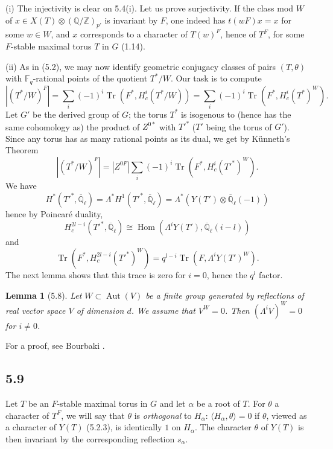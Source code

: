 \documentclass[11pt]{amsart}
\theoremstyle{plain}
\newtheorem{lemma}[theorem]{Lemma}
\theoremstyle{remark}
\DeclareMathOperator{\Hom}{Hom}
\DeclareMathOperator{\Tr}{Tr}
\DeclareMathOperator{\Aut}{Aut}
\begin{document}
(i) The injectivity is clear on 5.4(i). Let us prove surjectivity. If the class mod $W$ of $x \in X(T) \otimes (\mathbb{Q}/\mathbb{Z})_{p'}$ is invariant by $F$, one indeed has $t(wF)x = x$ for some $w \in W$, and $x$ corresponds to a character of $T(w)^F$, hence of $T^F$, for some $F$-stable maximal torus $T$ in $G$ (1.14).

(ii) As in (5.2), we may now identify geometric conjugacy classes of pairs $(T, \theta)$ with $\mathbb{F}_q$-rational points of the quotient $T^*/W$. Our task is to compute
\[
|(T^*/W)^F| = \sum_i (-1)^i \Tr(F^*, H_c^i(T^*/W)) = \sum_i (-1)^i \Tr(F^*, H_c^i(T^*)^W).
\]
Let $G'$ be the derived group of $G$; the torus $T^*$ is isogenous to (hence has the same cohomology as) the product of $Z^{0*}$ with $T'^*$ ($T'$ being the torus of $G'$). Since any torus has as many rational points as its dual, we get by K\"unneth's Theorem
\[
|(T^*/W)^F| = |Z^{0F}| \sum_i (-1)^i \Tr(F^*, H_c^i(T'^*)^W).
\]
We have
\[
H^*(T'^*, \overline{\mathbb{Q}}_\ell) = \Lambda^* H^1(T'^*, \overline{\mathbb{Q}}_\ell) = \Lambda^* (Y(T') \otimes \overline{\mathbb{Q}}_\ell(-1))
\]
hence by Poincar\'e duality,
\[
H_c^{2l-i}(T'^*, \overline{\mathbb{Q}}_\ell) \cong \Hom(\Lambda^i Y(T'), \overline{\mathbb{Q}}_\ell(i-l))
\]
and
\[
\Tr(F^*, H_c^{2l-i}(T'^*)^W) = q^{l-i} \Tr(F, \Lambda^i Y(T')^W).
\]
The next lemma shows that this trace is zero for $i = 0$, hence the $q^l$ factor.

\begin{lemma}[5.8]
Let $W \subset \Aut(V)$ be a finite group generated by reflections of real vector space $V$ of dimension $d$. We assume that $V^W = 0$. Then $(\Lambda^i V)^W = 0$ for $i \neq 0$.
\end{lemma}

For a proof, see Bourbaki \cite[Ch.\ V, Ex.\ 3 of \S 2]{Bou}.

\subsection{5.9} Let $T$ be an $F$-stable maximal torus in $G$ and let $\alpha$ be a root of $T$. For $\theta$ a character of $T^F$, we will say that $\theta$ is \textit{orthogonal} to $H_\alpha$: $\langle H_\alpha, \theta \rangle = 0$ if $\theta$, viewed as a character of $Y(T)$ (5.2.3), is identically $1$ on $H_\alpha$. The character $\theta$ of $Y(T)$ is then invariant by the corresponding reflection $s_\alpha$.
\end{document}
